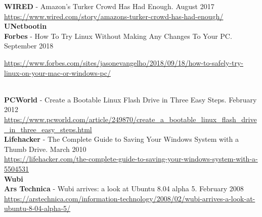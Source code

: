 \documentclass[10pt,A4]{article}
\begin{document}
\textbf{WIRED} - Amazon's Turker Crowd Has Had Enough. \hfill August 2017\\
\url{https://www.wired.com/story/amazons-turker-crowd-has-had-enough/}\\

\textcolor{sectcol}{\textbf{UNetbootin}}\\

\textbf{Forbes} - How To Try Linux Without Making Any Changes To Your PC. \hfill September 2018\\
\begin{small}
\url{https://www.forbes.com/sites/jasonevangelho/2018/09/18/how-to-safely-try-linux-on-your-mac-or-windows-pc/}
\end{small}\\

\textbf{PCWorld} - Create a Bootable Linux Flash Drive in Three Easy Steps. \hfill February 2012\\
\url{https://www.pcworld.com/article/249870/create_a_bootable_linux_flash_drive_in_three_easy_steps.html}\\

\textbf{Lifehacker} - The Complete Guide to Saving Your Windows System with a Thumb Drive. \hfill March 2010\\
\url{https://lifehacker.com/the-complete-guide-to-saving-your-windows-system-with-a-5504531}\\



\textcolor{sectcol}{\textbf{Wubi}}\\

\textbf{Ars Technica} - Wubi arrives: a look at Ubuntu 8.04 alpha 5. \hfill February 2008\\
\url{https://arstechnica.com/information-technology/2008/02/wubi-arrives-a-look-at-ubuntu-8-04-alpha-5/}\\
\end{document}
